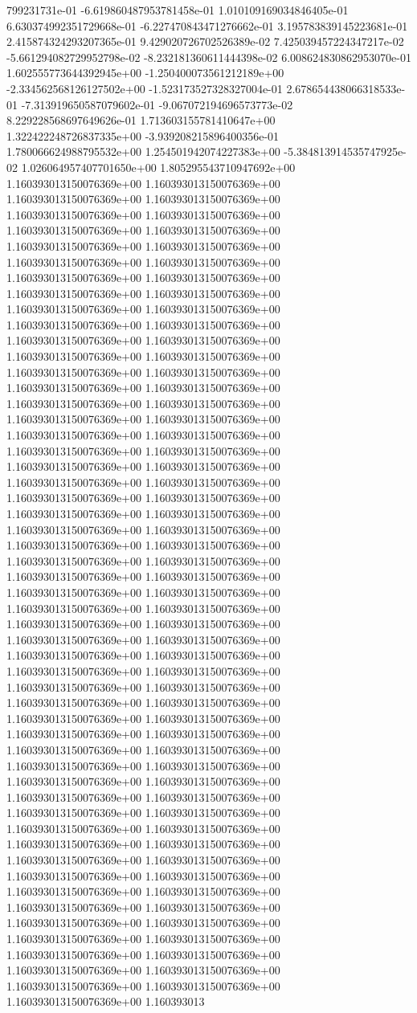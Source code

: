 799231731e-01	-6.619860487953781458e-01	1.010109169034846405e-01	6.630374992351729668e-01	-6.227470843471276662e-01	3.195783839145223681e-01	2.415874324293207365e-01	9.429020726702526389e-02	7.425039457224347217e-02	-5.661294082729952798e-02	-8.232181360611444398e-02	6.008624830862953070e-01	1.602555773644392945e+00	-1.250400073561212189e+00	-2.334562568126127502e+00	-1.523173527328327004e-01	2.678654438066318533e-01	-7.313919650587079602e-01	-9.067072194696573773e-02	8.229228568697649626e-01	1.713603155781410647e+00	1.322422248726837335e+00	-3.939208215896400356e-01	1.780066624988795532e+00	1.254501942074227383e+00	-5.384813914535747925e-02	1.026064957407701650e+00	1.805295543710947692e+00
1.160393013150076369e+00	1.160393013150076369e+00	1.160393013150076369e+00	1.160393013150076369e+00	1.160393013150076369e+00	1.160393013150076369e+00	1.160393013150076369e+00	1.160393013150076369e+00	1.160393013150076369e+00	1.160393013150076369e+00	1.160393013150076369e+00	1.160393013150076369e+00	1.160393013150076369e+00	1.160393013150076369e+00	1.160393013150076369e+00	1.160393013150076369e+00	1.160393013150076369e+00	1.160393013150076369e+00	1.160393013150076369e+00	1.160393013150076369e+00	1.160393013150076369e+00	1.160393013150076369e+00	1.160393013150076369e+00	1.160393013150076369e+00	1.160393013150076369e+00	1.160393013150076369e+00	1.160393013150076369e+00	1.160393013150076369e+00	1.160393013150076369e+00	1.160393013150076369e+00	1.160393013150076369e+00	1.160393013150076369e+00	1.160393013150076369e+00	1.160393013150076369e+00	1.160393013150076369e+00	1.160393013150076369e+00	1.160393013150076369e+00	1.160393013150076369e+00	1.160393013150076369e+00	1.160393013150076369e+00	1.160393013150076369e+00	1.160393013150076369e+00	1.160393013150076369e+00	1.160393013150076369e+00	1.160393013150076369e+00	1.160393013150076369e+00	1.160393013150076369e+00	1.160393013150076369e+00	1.160393013150076369e+00	1.160393013150076369e+00	1.160393013150076369e+00	1.160393013150076369e+00	1.160393013150076369e+00	1.160393013150076369e+00	1.160393013150076369e+00	1.160393013150076369e+00	1.160393013150076369e+00	1.160393013150076369e+00	1.160393013150076369e+00	1.160393013150076369e+00	1.160393013150076369e+00	1.160393013150076369e+00	1.160393013150076369e+00	1.160393013150076369e+00	1.160393013150076369e+00	1.160393013150076369e+00	1.160393013150076369e+00	1.160393013150076369e+00	1.160393013150076369e+00	1.160393013150076369e+00	1.160393013150076369e+00	1.160393013150076369e+00	1.160393013150076369e+00	1.160393013150076369e+00	1.160393013150076369e+00	1.160393013150076369e+00	1.160393013150076369e+00	1.160393013150076369e+00	1.160393013150076369e+00	1.160393013150076369e+00	1.160393013150076369e+00	1.160393013150076369e+00	1.160393013150076369e+00	1.160393013150076369e+00	1.160393013150076369e+00	1.160393013150076369e+00	1.160393013150076369e+00	1.160393013150076369e+00	1.160393013150076369e+00	1.160393013150076369e+00	1.160393013150076369e+00	1.160393013150076369e+00	1.160393013150076369e+00	1.160393013150076369e+00	1.160393013150076369e+00	1.160393013150076369e+00	1.160393013150076369e+00	1.160393013150076369e+00	1.160393013150076369e+00	1.160393013150076369e+00	1.160393013150076369e+00	1.160393013150076369e+00	1.160393013150076369e+00	1.160393013150076369e+00	1.160393013150076369e+00	1.160393013